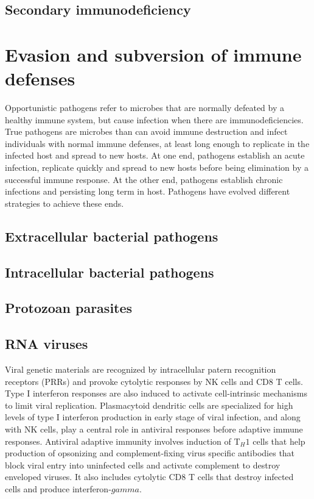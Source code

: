 \documentclass[11pt]{article}
\begin{document}
\begin{sloppypar}
\subsection{Secondary immunodeficiency}

\section{Evasion and subversion of immune defenses}
Opportunistic pathogens refer to microbes that are normally defeated by a healthy immune system, but cause infection when there are immunodeficiencies. 
True pathogens are microbes than can avoid immune destruction and infect individuals with normal immune defenses, at least long enough to replicate in the infected host and spread to new hosts. 
At one end, pathogens establish an acute infection, replicate quickly and spread to new hosts before being elimination by a successful immune response. 
At the other end, pathogens establish chronic infections and persisting long term in host. 
Pathogens have evolved different strategies to achieve these ends. 

\subsection{Extracellular bacterial pathogens}

\subsection{Intracellular bacterial pathogens}

\subsection{Protozoan parasites}

\subsection{RNA viruses}
Viral genetic materials are recognized by intracellular patern recognition receptors (PRRs) and provoke cytolytic responses by NK cells and CD8 T cells. 
Type I interferon responses are also induced to activate cell-intrinsic mechanisms to limit viral replication. 
Plasmacytoid dendritic cells are specialized for high levels of type I interferon production in early stage of viral infection, and along with NK cells, play a central role in antiviral responses before adaptive immune responses. 
Antiviral adaptive immunity involves induction of T$_H1$ cells that help production of opsonizing and complement-fixing virus specific antibodies that block viral entry into uninfected cells and activate complement to destroy enveloped viruses. 
It also includes cytolytic CD8 T cells that destroy infected cells and produce interferon-$gamma$. 


\end{sloppypar}
\end{document}
